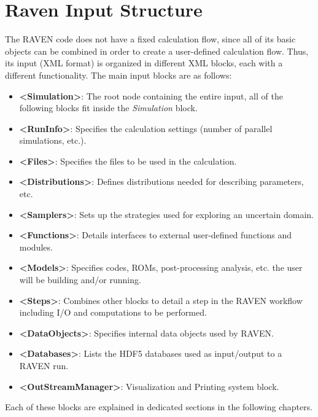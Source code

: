 \section{Raven Input Structure}
The RAVEN code does not have a fixed calculation flow, since all of its basic
objects can be combined in order to create a user-defined calculation flow.
%
Thus, its input (XML format) is organized in different XML blocks, each with a
different functionality.
%
The main input blocks are as follows:
\begin{itemize}
  \item \textbf{\textless Simulation\textgreater}: The root node containing the
  entire input, all of
  the following blocks fit inside the \emph{Simulation} block.
  \item \textbf{\textless RunInfo\textgreater}: Specifies the calculation
  settings (number of parallel simulations, etc.).
  \item \textbf{\textless Files\textgreater}: Specifies the files to be
  used in the calculation.
  \item \textbf{\textless Distributions\textgreater}: Defines distributions
  needed for describing parameters, etc.
  \item \textbf{\textless Samplers\textgreater}: Sets up the strategies used for
  exploring an uncertain domain.
  \item \textbf{\textless Functions\textgreater}: Details interfaces to external
  user-defined functions and modules.
  \item \textbf{\textless Models\textgreater}: Specifies codes, ROMs,
  post-processing analysis, etc.
  the user will be building and/or running.
  \item \textbf{\textless Steps\textgreater}: Combines other blocks to detail a
  step in the RAVEN workflow including I/O and computations to be performed.
  \item \textbf{\textless DataObjects\textgreater}: Specifies internal data objects
  used by RAVEN.
  \item \textbf{\textless Databases\textgreater}: Lists the HDF5 databases used
  as input/output to a
  RAVEN run.
  \item \textbf{\textless OutStreamManager\textgreater}: Visualization and
  Printing system block.
\end{itemize}

Each of these blocks are explained in dedicated sections in the following
chapters.
%
